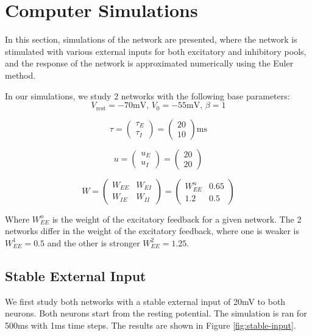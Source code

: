 \documentclass[10pt,twocolumn]{article}
\begin{document}

\section{Computer Simulations}
In this section, simulations of the network are presented,
where the network is stimulated with various external inputs for 
both excitatory and inhibitory pools, and the
response of the network is approximated numerically using the Euler method.

In our simulations, we study 2 networks with the following base parameters:
$$
V_{\text{rest}} = -70 \text{mV, } V_0 = -55 \text{mV, } \beta = 1
$$

$$
\tau 
= \begin{pmatrix} \tau_E \\ \tau_I \end{pmatrix} 
= \begin{pmatrix} 20 \\ 10 \end{pmatrix}\text{ms} 
$$

$$
u
= \begin{pmatrix} u_E \\ u_I \end{pmatrix}
= \begin{pmatrix} 20 \\ 20 \end{pmatrix}
$$

$$
W 
= \begin{pmatrix} W_{EE} & W_{EI} \\ W_{IE} & W_{II} \end{pmatrix}
= \begin{pmatrix} W^n_{EE} & 0.65 \\ 1.2 & 0.5 \end{pmatrix}
$$

Where $W^n_{EE}$ is the weight of the excitatory feedback for a given network.
The 2 networks differ in the weight of the excitatory feedback, where one is weaker 
is $W^1_{EE} = 0.5$ and the other is stronger $W^2_{EE} = 1.25$.

\subsection{Stable External Input}
We first study both networks with a stable external input of 20mV to both neurons.
Both neurons start from the resting potential. The simulation is ran for 500ms 
with 1ms time steps. The results are shown in Figure \ref{fig:stable-input}.
\end{document}

